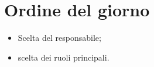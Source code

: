 \section{Ordine del giorno}

\begin{itemize}
    \item Scelta del responsabile;
    \item scelta dei ruoli principali.
\end{itemize}